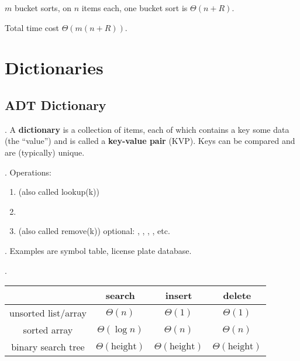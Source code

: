 \documentclass{article}
\begin{document}
\begin{tcolorbox}[colback=yellow!10!white,colframe=orange]
    $m$ bucket sorts, on $n$ items each, one bucket sort is $\Theta(n + R)$.
\end{tcolorbox}

\begin{tcolorbox}[colback=yellow!10!white,colframe=orange]
    Total time cost $\Theta(m (n + R))$. 
\end{tcolorbox}

\newpage

\section{Dictionaries}

\subsection{ADT Dictionary}

\begin{deff}.
    A \textbf{dictionary} is a collection of items, each of which contains a key some data (the ``value'') and is called a \textbf{key-value pair} (KVP). Keys can be compared and are (typically) unique. 
\end{deff}

\begin{codes}[].
    Operations: \begin{enumerate}
        \item {} (also called lookup(k)) 
        \item {} 
        \item {} (also called remove(k)) 
        optional: , , , , etc.
    \end{enumerate}
\end{codes}

\begin{examplee}[].
    Examples are symbol table, license plate database. 
\end{examplee}

\begin{result}[].
    \begin{center}
        \begin{tabular}{c||c|c|c}
            \textbf{} & \textbf{search} & \textbf{insert} & \textbf{delete} \\ \hline
            unsorted list/array & $\Theta(n)$ & $\Theta(1)$ & $\Theta(1)$ \\ \hline
            sorted array & $\Theta(\log n)$ & $\Theta(n)$ & $\Theta(n)$ \\ \hline
            binary search tree & $\Theta(\text{height})$ & $\Theta(\text{height})$ & $\Theta(\text{height})$ 
        \end{tabular}
    \end{center}
\end{result}
\end{document}
